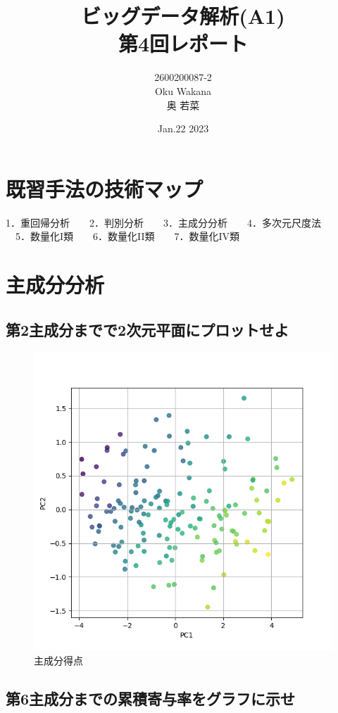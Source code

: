 \documentclass[dvipdfmx,autodetect-engine,titlepage]{jsarticle}
\title{ビッグデータ解析(A1)\\
第4回レポート\\
}
\author{2600200087-2\\Oku Wakana\\奥 若菜}
\date{Jan.22 2023}
\begin{document}
\maketitle

\section{既習手法の技術マップ}

1．重回帰分析　　2．判別分析　　3．主成分分析　　4．多次元尺度法\\
　5．数量化I類　　6．数量化II類　　7．数量化IV類

\section{主成分分析}
\subsection{第2主成分までで2次元平面にプロットせよ}

\begin{figure}[H]
  \centering
  \includegraphics[scale=0.5]{CPA.png}
  \caption{主成分得点}\label{fig:図1}
\end{figure}

\subsection{第6主成分までの累積寄与率をグラフに示せ}
\end{document}
